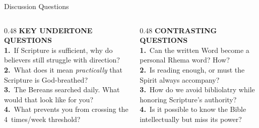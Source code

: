 \documentclass[aspectratio=169,12pt]{beamer}
\begin{document}
{\begin{frame}[plain]
\end{frame}
}

\begin{frame}{Discussion Questions}

\begin{columns}[T]
\begin{column}{0.48\textwidth}
{\small\bfseries\color{teal} KEY UNDERTONE QUESTIONS}\\[6pt]
{\small
\textbf{\color{navy}1.}~If Scripture is sufficient, why do believers still struggle with direction?\\[5pt]
\textbf{\color{navy}2.}~What does it mean \textit{practically} that Scripture is God-breathed?\\[5pt]
\textbf{\color{navy}3.}~The Bereans searched daily. What would that look like for you?\\[5pt]
\textbf{\color{navy}4.}~What prevents you from crossing the 4~times/week threshold?
}
\end{column}
\begin{column}{0.48\textwidth}
{\small\bfseries\color{warmred} CONTRASTING QUESTIONS}\\[6pt]
{\small
\textbf{\color{navy}1.}~Can the written Word become a personal Rhema word? How?\\[5pt]
\textbf{\color{navy}2.}~Is reading enough, or must the Spirit always accompany?\\[5pt]
\textbf{\color{navy}3.}~How do we avoid bibliolatry while honoring Scripture's authority?\\[5pt]
\textbf{\color{navy}4.}~Is it possible to know the Bible intellectually but miss its power?
}
\end{column}
\end{columns}

\end{frame}
\end{document}

